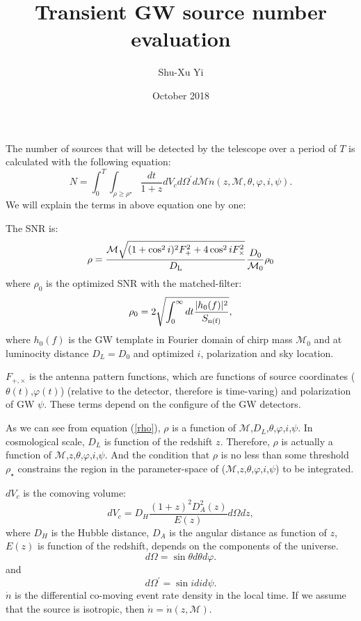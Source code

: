 \documentclass{article}
\title{Transient GW source number evaluation}
\author{Shu-Xu Yi}
\date{October 2018}
\begin{document}
\maketitle
The number of sources that will be detected by the telescope over a period of $T$ is calculated with the following equation:
\begin{equation}
    N=\int^T_0\int_{\rho\ge\rho^\star}\frac{dt}{1+z}dV_cd\Omega^\prime d\mathcal{M}\dot{n}(z,\mathcal{M},\theta,\varphi,i,\psi).
\end{equation}
We will explain the terms in above equation one by one:

The SNR is:
\begin{equation}
    \rho=\frac{\mathcal{M}{\sqrt{(1+\cos^2i)^2F^2_++4\cos^2i F^2_\times}}}{D_{\rm{L}}}\frac{D_0}{\mathcal{M}_0}\rho_0
    \label{rho}
\end{equation}
where $\rho_0$ is the optimized SNR with the matched-filter:
\begin{equation}
    \rho_0=2\sqrt{\int^\infty_0dt\frac{|h_0(f)|^2}{S_{\rm{n}(f)}}},
\end{equation}
where $h_0(f)$ is the GW template in Fourier domain of chirp mass $\mathcal{M}_0$ and at luminocity distance $D_L=D_0$ and optimized $i$, polarization and sky location. 

$F_{+,\times}$ is the antenna pattern functions, which are functions of source coordinates ($\theta(t)$,$\varphi(t)$) (relative to the detector, therefore is time-varing) and polarization of GW $\psi$. These terms depend on the configure of the GW detectors. 

As we can see from equation (\ref{rho}), $\rho$ is a function of $\mathcal{M}$,$D_L$,$\theta$,$\varphi$,$i$,$\psi$. In cosmological scale, $D_L$ is function of the redshift $z$. Therefore, $\rho$ is actually a function of $\mathcal{M}$,$z$,$\theta$,$\varphi$,$i$,$\psi$. And the condition that $\rho$ is no less than some threshold $\rho_\star$ constrains the region in the parameter-space of ($\mathcal{M}$,$z$,$\theta$,$\varphi$,$i$,$\psi$) to be integrated. 

$dV_c$ is the comoving volume:
\begin{equation}
    dV_c=D_H\frac{(1+z)^2D^2_A(z)}{E(z)}d\Omega dz,
\end{equation}
where 
$D_H$ is the Hubble distance, $D_A$ is the angular distance as function of $z$, $E(z)$ is function of the redshift, depends on the components of the universe. 
\begin{equation}
    d\Omega=\sin\theta d\theta d\varphi. 
\end{equation}
and 
\begin{equation}
    d\Omega^\prime=\sin idid\psi. 
\end{equation}
$\dot{n}$ is the differential co-moving event rate density in the local time. If we assume that the source is isotropic, then $\dot{n}=\dot{n}(z,\mathcal{M})$. 
\end{document}
